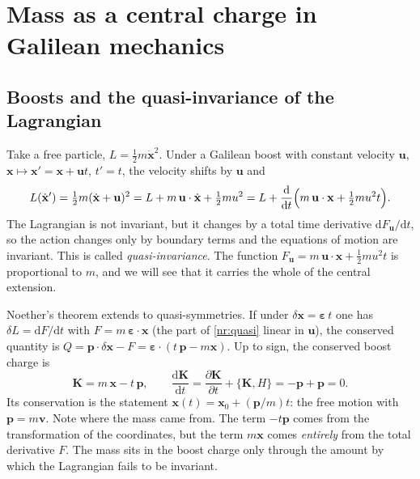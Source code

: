 \section{Mass as a central charge in Galilean mechanics}
\label{sec:nr-galilei}

\subsection{Boosts and the quasi-invariance of the Lagrangian}

Take a free particle, $L=\tfrac12 m\dot{\mathbf{x}}^2$. Under a Galilean boost
with constant velocity $\mathbf{u}$,
$\mathbf{x}\mapsto\mathbf{x}'=\mathbf{x}+\mathbf{u}t$, $t'=t$, the velocity
shifts by $\mathbf{u}$ and
\begin{equation}
  L(\dot{\mathbf{x}}')
  = \tfrac12 m(\dot{\mathbf{x}}+\mathbf{u})^2
  = L + m\,\mathbf{u}\cdot\dot{\mathbf{x}} + \tfrac12 m u^2
  = L + \frac{\mathrm{d}}{\mathrm{d}t}\Bigl(m\,\mathbf{u}\cdot\mathbf{x}
      + \tfrac12 m u^2 t\Bigr).
  \label{nr:quasi}
\end{equation}
The Lagrangian is not invariant, but it changes by a total time derivative
$\mathrm{d}F_{\mathbf u}/\mathrm{d}t$, so the action changes only by boundary
terms and the equations of motion are invariant. This is called
\emph{quasi-invariance}. The function
$F_{\mathbf u}=m\,\mathbf{u}\cdot\mathbf{x}+\tfrac12 m u^2 t$
is proportional to $m$, and we will see that it carries the whole of the
central extension.

Noether's theorem extends to quasi-symmetries. If under
$\delta\mathbf{x}=\boldsymbol{\varepsilon}\,t$ one has
$\delta L=\mathrm{d}F/\mathrm{d}t$ with $F=m\,\boldsymbol{\varepsilon}\cdot\mathbf{x}$
(the part of \eqref{nr:quasi} linear in $\mathbf u$), the conserved quantity is
$Q=\mathbf{p}\cdot\delta\mathbf{x}-F=\boldsymbol{\varepsilon}\cdot(t\,\mathbf{p}-m\mathbf{x})$.
Up to sign, the conserved boost charge is
\begin{equation}
  \mathbf{K}=m\,\mathbf{x}-t\,\mathbf{p},\qquad
  \frac{\mathrm{d}\mathbf{K}}{\mathrm{d}t}
  =\frac{\partial\mathbf{K}}{\partial t}+\{\mathbf{K},H\}
  =-\mathbf{p}+\mathbf{p}=0 .
  \label{nr:Kcons}
\end{equation}
Its conservation is the statement $\mathbf{x}(t)=\mathbf{x}_0+(\mathbf{p}/m)t$:
the free motion with $\mathbf{p}=m\mathbf{v}$. Note where the mass came from.
The term $-t\mathbf{p}$ comes from the transformation of the coordinates, but
the term $m\mathbf{x}$ comes \emph{entirely} from the total derivative $F$. The
mass sits in the boost charge only through the amount by which the Lagrangian
fails to be invariant.

